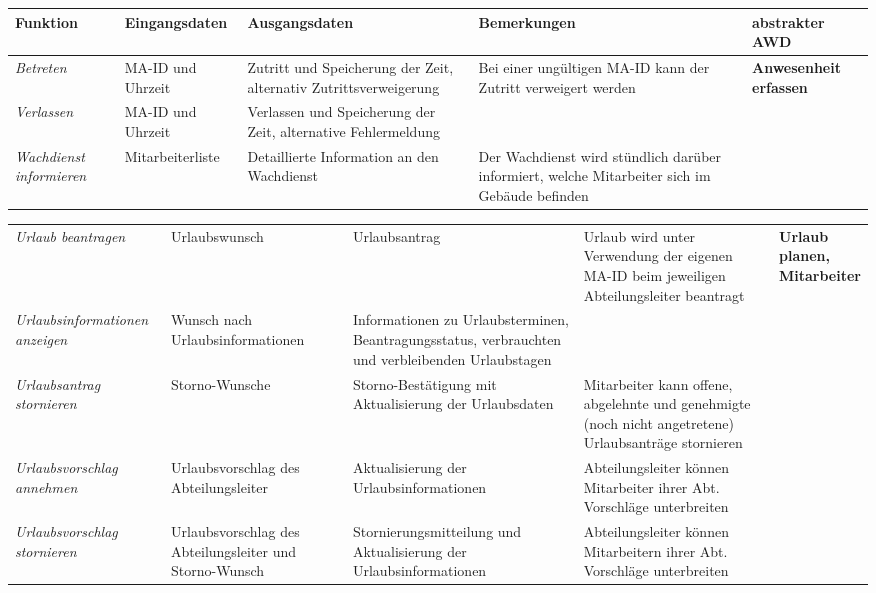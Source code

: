 {
\vspace{1cm}
\hspace{-3,5cm}
\footnotesize
\begin{tabular}{|p{3cm}|p{4cm}|p{4cm}|p{4cm}|p{2cm}|}
	\hline
		\textbf{Funktion} &
		\textbf{Eingangsdaten} &
		\textbf{Ausgangsdaten} &
		\textbf{Bemerkungen} &
		\textbf{abstrakter AWD} \\
	\hline \hline
		\textit{Betreten} &
		MA-ID und Uhrzeit &
		Zutritt und Speicherung der Zeit, alternativ Zutrittsverweigerung &
		Bei einer ungültigen MA-ID kann der Zutritt verweigert werden &
		\textbf{Anwesenheit erfassen} \\
	\cline{1-4}
		\textit{Verlassen} &
		MA-ID und Uhrzeit &
		Verlassen und Speicherung der Zeit, alternative Fehlermeldung &
		&
		\\
	\cline{1-4}
		\textit{Wachdienst \mbox{informieren}} &
		Mitarbeiterliste &
		Detaillierte Information an den Wachdienst &
		Der Wachdienst wird stündlich darüber informiert, welche Mitarbeiter sich im Gebäude befinden &
		\\
	\hline
\end{tabular}
}

{
\vspace{0,5cm}
\hspace{-3,5cm}
\footnotesize
\begin{tabular}{|p{3cm}|p{4cm}|p{4cm}|p{4cm}|p{2cm}|}
	\hline
		\textit{Urlaub beantragen} &
		Urlaubswunsch &
		Urlaubsantrag &
		Urlaub wird unter Verwendung der eigenen MA-ID beim jeweiligen Abteilungsleiter beantragt &
		\textbf{Urlaub \newline planen, \newline Mitarbeiter } \\
	\cline{1-4}
		\textit{Urlaubsinformationen anzeigen} &
		Wunsch nach Urlaubsinformationen &
		Informationen zu Urlaubsterminen, Beantragungs\-status, verbrauchten und verbleibenden Urlaubstagen &
		&
		\\
	\cline{1-4}
		\textit{Urlaubsantrag \newline stornieren} &
		Storno-Wunsche &
		Storno-Bestätigung mit Aktualisierung der Urlaubsdaten &
		Mitarbeiter kann offene, abgelehnte und genehmigte (noch nicht angetretene) Urlaubsanträge stornieren &
		\\
	\cline{1-4}
		\textit{Urlaubsvorschlag annehmen} &
		Urlaubsvorschlag des Abteilungsleiter &
		 Aktualisierung der Urlaubsinformationen &
		Abteilungsleiter können Mitarbeiter ihrer Abt. Vorschläge unterbreiten &
		\\
	\cline{1-4}
		\textit{Urlaubsvorschlag \newline stornieren} &
		Urlaubsvorschlag des Abteilungsleiter und Storno-Wunsch &
		Stornierungsmitteilung und Aktualisierung der Urlaubsinformationen &
		Abteilungsleiter können Mitarbeitern ihrer Abt. Vorschläge unterbreiten &
		\\
	\hline
\end{tabular}
}

